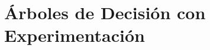 \documentclass[ 10pt, xcolor = dvipsnames]{beamer}
\begin{document}
\section{\'Arboles de Decisi\'on con Experimentaci\'on}

\begin{frame}[allowframebreaks]
\frametitle{\insertsection}

\end{frame}
\end{document}
